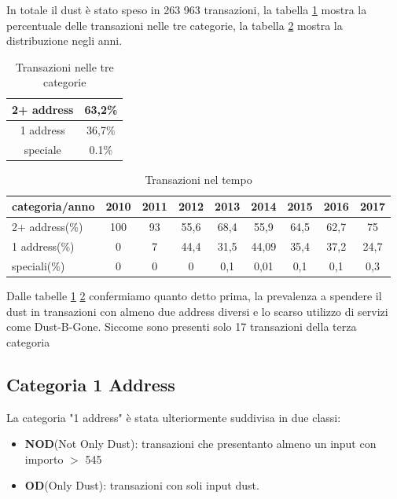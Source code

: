 In totale il dust è stato speso in 263 963 transazioni, la tabella \ref{tab:tx_categories} mostra la percentuale delle transazioni nelle tre categorie, la tabella \ref{tab:tx_categories_year} mostra la distribuzione negli anni.
\begin{table}[H]
    \centering
    \begin{tabular}{|c|c|}
        \hline
        2+ address & 63,2\%\\
        \hline
        1 address & 36,7\%\\
        \hline
        speciale & 0.1\%\\
        \hline
    \end{tabular}
    \caption{Transazioni nelle tre categorie}
    \label{tab:tx_categories}
\end{table}
\begin{table}[H]
    \centering
    \begin{tabular}{|l|c|c|c|c|c|c|c|c|}
        \hline
            categoria/anno  & 2010 & 2011 & 2012 & 2013 & 2014 & 2015 & 2016 & 2017\\
        \hline 
         2+ address(\%) & 100 & 93 & 55,6 & 68,4 & 55,9 & 64,5 & 62,7 & 75 \\
         \hline
         1 address(\%) & 0 & 7 & 44,4 & 31,5 & 44,09 & 35,4 & 37,2 & 24,7  \\
         \hline
         speciali(\%) & 0 & 0 & 0 & 0,1 & 0,01 & 0,1 & 0,1 & 0,3 \\
         \hline
    \end{tabular}
    \caption{Transazioni nel tempo}
    \label{tab:tx_categories_year}
\end{table}
Dalle tabelle \ref{tab:tx_categories} \ref{tab:tx_categories_year} confermiamo quanto detto prima, la prevalenza a spendere il dust in transazioni con almeno due address diversi e lo scarso utilizzo di servizi come Dust-B-Gone. Siccome sono presenti solo 17 transazioni della terza categoria 
\subsection{Categoria 1 Address}
La categoria "1 address" è stata ulteriormente suddivisa in due classi:
\begin{itemize}
    \item \textbf{NOD}(Not Only Dust): transazioni che presentanto almeno un input con importo $>$ 545  
    \item \textbf{OD}(Only Dust): transazioni con soli input dust.
\end{itemize}

